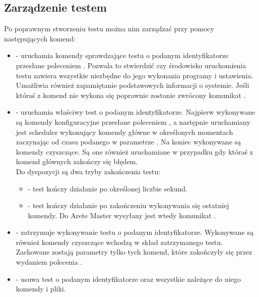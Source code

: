 \documentclass[00-praca-magisterska.tex]{subfiles}
\begin{document}
\subsection{Zarządzenie testem}
\label{arete-slave-zarzadzanie-testem}

Po poprawnym stworzeniu testu można nim zarządzać przy pomocy
następujących komend:

\begin{itemize}
  \setlength{\itemsep}{10pt}

\item{ - uruchamia komendy sprawdzające
testu o podanym identyfikatorze przesłane poleceniem . Pozwala to
stwierdzić czy środowisko uruchomienia testu zawiera wszystkie niezbędne do jego
wykonania programy i ustawienia. Umożliwia również zapamiętanie podstawowych
informacji o systemie.  Jeśli któraś z komend nie wykona się poprawnie zostanie
zwrócony komunikat .}

\item{ - uruchamia właściwy test o podanym identyfikatorze. Najpierw
wykonywane są komendy konfiguracyjne przesłane poleceniem ,
a następnie uruchamiany jest scheduler wykonujący komendy główne w
określonych momentach zaczynając od czasu podanego w parametrze . Na
koniec wykonywane są komendy czyszczące. Są one również uruchamiane w przypadku
gdy któraś z komend głównych zakończy się błędem. \\

Do dyspozycji są dwa tryby zakończenia testu: \\

\begin{itemize}
  \setlength{\itemsep}{10pt}

\item{ - test kończy działanie po określonej liczbie
sekund.}

\item{ - test kończy działanie po zakończeniu wykonywania się
ostatniej komendy. Do Arete Master wysyłany jest wtedy komunikat .}

\end{itemize}}

\item{ - zatrzymuje wykonywanie testu o
podanym identyfikatorze. Wykonywane są również komendy czyszczące wchodzą w
skład zatrzymanego testu. Zachowane zostają parametry tylko tych komend, które
zakończyły się przez wydaniem polecenia .}

\item{ - usuwa test o podanym
identyfikatorze oraz wszystkie należące do niego komendy i pliki.}

\end{itemize}
\end{document}
